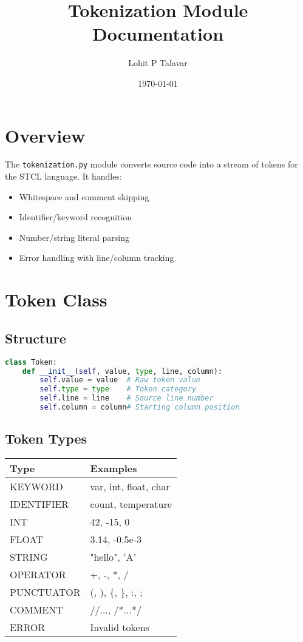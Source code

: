 \documentclass{article}
\title{Tokenization Module Documentation}
\author{Lohit P Talavar}
\date{\today}
\begin{document}
\maketitle
\tableofcontents

\section{Overview}
The \texttt{tokenization.py} module converts source code into a stream of tokens for the STCL language. 
It handles:
\begin{itemize}
    \item Whitespace and comment skipping
    \item Identifier/keyword recognition
    \item Number/string literal parsing
    \item Error handling with line/column tracking
\end{itemize}

\section{Token Class}
\subsection{Structure}
\begin{lstlisting}[language=Python]
class Token:
    def __init__(self, value, type, line, column):
        self.value = value  # Raw token value
        self.type = type    # Token category
        self.line = line    # Source line number
        self.column = column# Starting column position
\end{lstlisting}

\subsection{Token Types}
\begin{tabular}{|l|l|}
\hline
\textbf{Type} & \textbf{Examples} \\ \hline
KEYWORD & var, int, float, char \\ \hline
IDENTIFIER & count, temperature \\ \hline
INT & 42, -15, 0 \\ \hline
FLOAT & 3.14, -0.5e-3 \\ \hline
STRING & "hello", 'A' \\ \hline
OPERATOR & +, -, *, / \\ \hline
PUNCTUATOR & (, ), \{, \}, :, ; \\ \hline
COMMENT & //..., /*...*/ \\ \hline
ERROR & Invalid tokens \\ \hline
\end{tabular}
\end{document}
